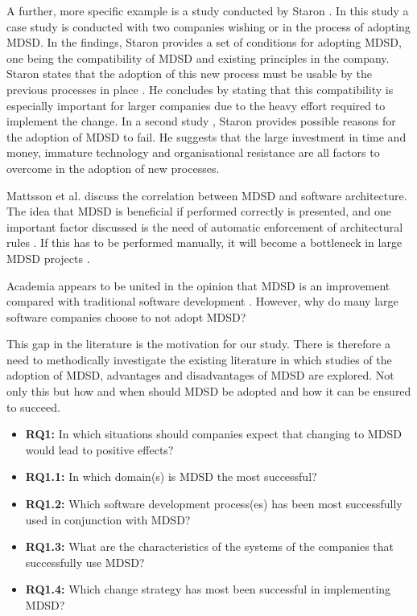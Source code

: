 \documentclass[10pt,twocolumn]{article}
\begin{document}
A further, more specific example is a study conducted by Staron \cite{staron2006adopting}. In this study a case study is conducted with two companies wishing or in the process of adopting MDSD. In the findings, Staron provides a set of conditions for adopting MDSD, one being the compatibility of MDSD and existing principles in the company. Staron states that the adoption of this new process must be usable by the previous processes in place \cite{staron2006adopting}. He concludes by stating that this compatibility is especially important for larger companies due to the heavy effort required to implement the change. In a second study \cite{staron2008transitioning}, Staron provides possible reasons for the adoption of MDSD to fail. He suggests that the large investment in time and money, immature technology and organisational resistance are all factors to overcome in the adoption of new processes.

Mattsson et al. \cite{mattsson2009linking} discuss the correlation between MDSD and software architecture. The idea that MDSD is beneficial if performed correctly is presented, and one important factor discussed is the need of automatic enforcement of architectural rules \cite{mattsson2009linking}. If this has to be performed manually, it will become a bottleneck in large MDSD projects \cite{mattsson2009linking}.


Academia appears to be united in the opinion that MDSD is an improvement compared with traditional software development \cite{staron2006adopting} \cite{volter2013model}. However, why do many large software companies choose to not adopt MDSD?

This gap in the literature is the motivation for our study. There is therefore a need to methodically investigate the existing literature in which studies of the adoption of MDSD, advantages and disadvantages of MDSD are explored. Not only this but how and when should MDSD be adopted and how it can be ensured to succeed.

\begin{itemize}
\item \textbf{RQ1:} In which situations should companies expect that changing to MDSD would lead to positive effects? 
\item \textbf{RQ1.1:} In which domain(s) is MDSD the most successful? 
\item \textbf{RQ1.2:} Which software development process(es) has been most successfully used in conjunction with MDSD?
\item \textbf{RQ1.3:} What are the characteristics of the systems of the companies that successfully use MDSD?
\item \textbf{RQ1.4:} Which change strategy has most been successful in implementing MDSD? 
\end{itemize}
\end{document}
